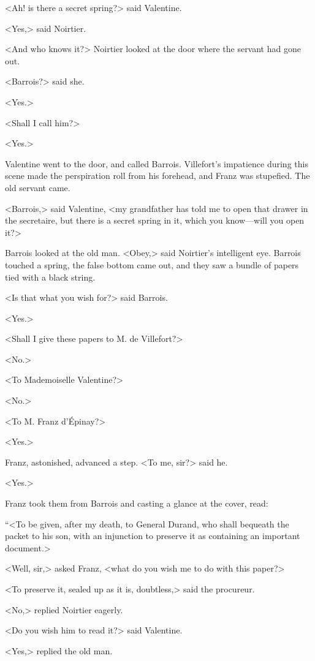  <Ah! is there a secret spring?> said Valentine. 

 <Yes,> said Noirtier. 

 <And who knows it?> Noirtier looked at the door where the servant had gone out. 

 <Barrois?> said she. 

 <Yes.> 

 <Shall I call him?> 

 <Yes.> 

 Valentine went to the door, and called Barrois. Villefort's impatience during this scene made the perspiration roll from his forehead, and Franz was stupefied. The old servant came. 

 <Barrois,> said Valentine, <my grandfather has told me to open that drawer in the secretaire, but there is a secret spring in it, which you know—will you open it?> 

 Barrois looked at the old man. <Obey,> said Noirtier's intelligent eye. Barrois touched a spring, the false bottom came out, and they saw a bundle of papers tied with a black string. 

 <Is that what you wish for?> said Barrois. 

 <Yes.> 

 <Shall I give these papers to M. de Villefort?> 

 <No.> 

 <To Mademoiselle Valentine?> 

 <No.> 

 <To M. Franz d'Épinay?> 

 <Yes.> 

 Franz, astonished, advanced a step. <To me, sir?> said he. 

 <Yes.> 

 Franz took them from Barrois and casting a glance at the cover, read: 

 “<To be given, after my death, to General Durand, who shall bequeath the packet to his son, with an injunction to preserve it as containing an important document.> 

 <Well, sir,> asked Franz, <what do you wish me to do with this paper?> 

 <To preserve it, sealed up as it is, doubtless,> said the procureur. 

 <No,> replied Noirtier eagerly. 

 <Do you wish him to read it?> said Valentine. 

 <Yes,> replied the old man. 

